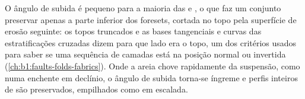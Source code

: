 O ângulo de subida é pequeno para a maioria das  e , o que faz um conjunto preservar apenas a parte inferior dos foresets, cortada no topo pela superfície de erosão seguinte: os topos truncados e as bases tangenciais e curvas das estratificações cruzadas dizem para que lado era o topo, um dos critérios usados para saber se uma sequência de camadas está na posição normal ou invertida (\cref{ch:b1:faults-folds-fabrics}). Onde a areia chove rapidamente da suspensão, como numa enchente em declínio, o ângulo de subida torna-se íngreme e perfis inteiros de  são preservados, empilhados como  em escalada.

